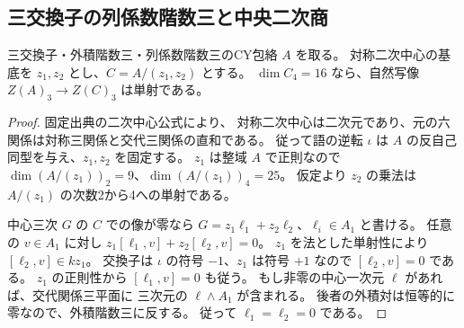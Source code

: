 \subsection{三交換子の列係数階数三と中央二次商}
\label{subsec:cubic-CY-three-column-three}

\begin{lemma}\label{lem:cubic-CY-three-column-three-center-injection}
三交換子・外積階数三・列係数階数三のCY包絡 $A$ を取る。
対称二次中心の基底を $z_1,z_2$ とし、$C=A/(z_1,z_2)$ とする。
$\dim C_4=16$ なら、自然写像 $Z(A)_3\to Z(C)_3$ は単射である。
\end{lemma}
\begin{proof}
固定出典\cite{AS4CYpinned}の二次中心公式により、
対称二次中心は二次元であり、元の六関係は対称三関係と交代三関係の直和である。
従って語の逆転 $\iota$ は $A$ の反自己同型を与え、$z_1,z_2$ を固定する。
$z_1$ は整域 $A$ で正則なので
$\dim(A/(z_1))_2=9$、$\dim(A/(z_1))_4=25$。
仮定より $z_2$ の乗法は $A/(z_1)$ の次数2から4への単射である。

中心三次 $G$ の $C$ での像が零なら $G=z_1\ell_1+z_2\ell_2$、$\ell_i\in A_1$ と書ける。
任意の $v\in A_1$ に対し
$z_1[\ell_1,v]+z_2[\ell_2,v]=0$。
$z_1$ を法とした単射性により $[\ell_2,v]\in kz_1$。
交換子は $\iota$ の符号 $-1$、$z_1$ は符号 $+1$ なので $[\ell_2,v]=0$ である。
$z_1$ の正則性から $[\ell_1,v]=0$ も従う。
もし非零の中心一次元 $\ell$ があれば、交代関係三平面に
三次元の $\ell\wedge A_1$ が含まれる。
後者の外積対は恒等的に零なので、外積階数三に反する。
従って $\ell_1=\ell_2=0$ である。
\end{proof}


